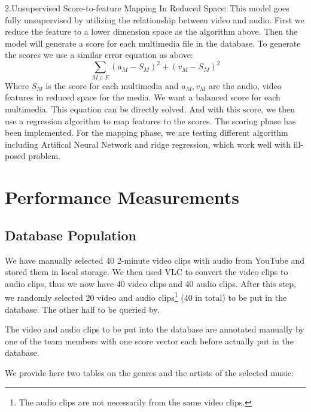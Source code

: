 \documentclass{report}
\begin{document}
2.Unsupervised Score-to-feature Mapping In Reduced Space:
This model goes fully unsupervised by utilizing the relationship between video and audio. First we reduce the feature to a lower dimension space as the algorithm above. Then the model will generate a score for each multimedia file in the database. 
To generate the scores we use a similar error equation as above:
$$\sum_{M\in F}(a_M - S_M )^2 + (v_M - S_M )^2 $$
Where $S_M$ is the score for each multimedia and $a_M, v_M$ are the audio, video features in reduced space for the media. We want a balanced score for each multimedia. This equation can be directly solved. And with this score, we then use a regression algorithm to map features to the scores.
The scoring phase has been implemented. For the mapping phase, we are testing different algorithm including Artifical Neural Network and ridge regression, which work well with ill-posed problem.


\chapter{Performance Measurements}

\section{Database Population}

We have manually selected 40 2-minute video clips with audio from YouTube and stored them in local storage. We then used VLC to convert the video clips to audio clips, thus we now have 40 video clips and 40 audio clips. After this step, we randomly selected 20 video and audio clips\footnote{The audio clips are not necessarily from the same video clips.} (40 in total) to be put in the database. The other half to be queried by.

The video and audio clips to be put into the database are annotated manually by one of the team members with one score vector each before actually put in the database.

We provide here two tables on the genres and the artists of the selected music:
\end{document}
